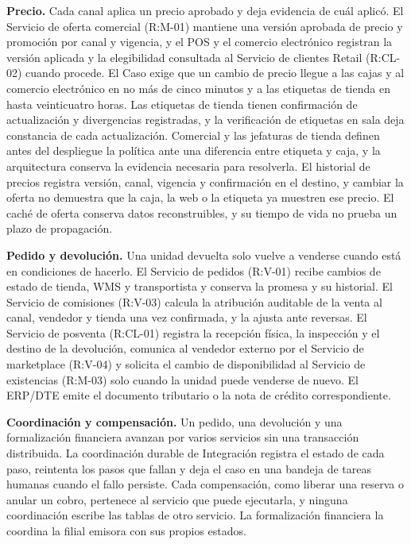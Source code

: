 \documentclass[11pt]{article}
\begin{document}
\textbf{Precio.} Cada canal aplica un precio aprobado y deja evidencia de cuál aplicó. El Servicio de oferta comercial (R:M-01) mantiene una versión aprobada de precio y promoción por canal y vigencia, y el POS y el comercio electrónico registran la versión aplicada y la elegibilidad consultada al Servicio de clientes Retail (R:CL-02) cuando procede. El Caso exige que un cambio de precio llegue a las cajas y al comercio electrónico en no más de cinco minutos y a las etiquetas de tienda en hasta veinticuatro horas. Las etiquetas de tienda tienen confirmación de actualización y divergencias registradas, y la verificación de etiquetas en sala deja constancia de cada actualización. Comercial y las jefaturas de tienda definen antes del despliegue la política ante una diferencia entre etiqueta y caja, y la arquitectura conserva la evidencia necesaria para resolverla. El historial de precios registra versión, canal, vigencia y confirmación en el destino, y cambiar la oferta no demuestra que la caja, la web o la etiqueta ya muestren ese precio. El caché de oferta conserva datos reconstruibles, y su tiempo de vida no prueba un plazo de propagación.

\textbf{Pedido y devolución.} Una unidad devuelta solo vuelve a venderse cuando está en condiciones de hacerlo. El Servicio de pedidos (R:V-01) recibe cambios de estado de tienda, WMS y transportista y conserva la promesa y su historial. El Servicio de comisiones (R:V-03) calcula la atribución auditable de la venta al canal, vendedor y tienda una vez confirmada, y la ajusta ante reversas. El Servicio de posventa (R:CL-01) registra la recepción física, la inspección y el destino de la devolución, comunica al vendedor externo por el Servicio de marketplace (R:V-04) y solicita el cambio de disponibilidad al Servicio de existencias (R:M-03) solo cuando la unidad puede venderse de nuevo. El ERP/DTE emite el documento tributario o la nota de crédito correspondiente.

\textbf{Coordinación y compensación.} Un pedido, una devolución y una formalización financiera avanzan por varios servicios sin una transacción distribuida. La coordinación durable de Integración registra el estado de cada paso, reintenta los pasos que fallan y deja el caso en una bandeja de tareas humanas cuando el fallo persiste. Cada compensación, como liberar una reserva o anular un cobro, pertenece al servicio que puede ejecutarla, y ninguna coordinación escribe las tablas de otro servicio. La formalización financiera la coordina la filial emisora con sus propios estados.
\end{document}
